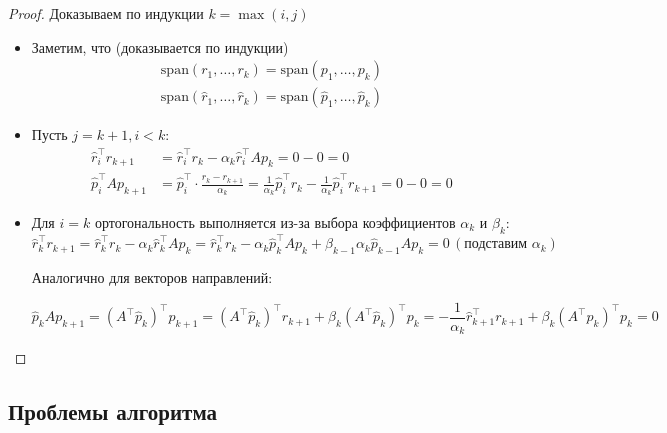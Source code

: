 \begin{proof}
    Доказываем по индукции $k = \max(i, j)$

    \begin{itemize}
        \item Заметим, что (доказывается по индукции)
            \begin{align*}
                \mathrm{span}(r_1, \ldots, r_k) = \mathrm{span}(p_1, \ldots, p_k)\\
                \mathrm{span}(\hat{r}_1, \ldots, \hat{r}_k) = \mathrm{span}(\hat{p}_1, \ldots, \hat{p}_k)
            \end{align*}

        \item Пусть $j = k + 1, i < k$:
            \begin{align*}
                \hat{r}_i^{\top} r_{k + 1} &= \hat{r}_i^{\top} r_k - \alpha_k \hat{r}_i^{\top} A p_k = 0 - 0 = 0\\
                \hat{p}_i^{\top} A p_{k + 1} &= \hat{p}_i^{\top} \cdot \frac{r_k - r_{k + 1}}{\alpha_k} = \frac{1}{\alpha_k} \hat{p}_i^{\top} r_k - \frac{1}{\alpha_k} \hat{p}_i^{\top} r_{k + 1} = 0 - 0 = 0
            \end{align*}

        \item Для $i = k$ ортогональность выполняется из-за выбора коэффициентов $\alpha_k$ и $\beta_k$:
            \[
                \hat{r}_k^{\top} r_{k + 1} = \hat{r}_k^{\top} r_k - \alpha_k \hat{r}_k^{\top} A p_k = \hat{r}_k^{\top} r_k - \alpha_k \hat{p}_k^{\top} A p_k + \beta_{k - 1} \alpha_k \hat{p}_{k - 1} A p_k = 0\, (\text{подставим } \alpha_k)
            \]

            Аналогично для векторов направлений:

            \[
                \hat{p}_k A p_{k + 1} = (A^{\top} \hat{p}_k)^{\top} p_{k + 1} = (A^{\top} \hat{p}_k)^{\top} r_{k + 1} + \beta_k (A^{\top} \hat{p}_k)^{\top} p_k = -\frac{1}{\alpha_k} \hat{r}_{k + 1}^{\top} r_{k + 1} + \beta_k (A^{\top} \hat{p}_k)^{\top} p_k = 0
            \]
    \end{itemize}
\end{proof}


\subsection{Проблемы алгоритма}
